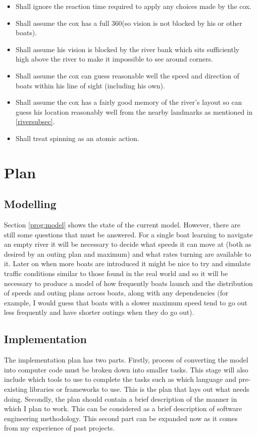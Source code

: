 \begin{itemize}
  \item Shall ignore the reaction time required to apply any choices
    made by the cox.
  \item Shall assume the cox has a full 360\textdegree (so vision is
    not blocked by his or other boats). 
  \item Shall assume his
    vision is blocked by the river bank which sits sufficiently high
    above the river to make it impossible to see around corners.
  \item Shall assume the cox can guess reasonable well the speed and
    direction of boats within his line of sight (including his own).
  \item Shall assume the cox has a fairly good memory of the river's
    layout so can guess his location reasonably well from the nearby
    landmarks as mentioned in \ref{riversubsec}.
  \item Shall treat spinning as an atomic action.
\end{itemize}

\section{Plan}

\subsection{Modelling}

Section \ref{prog:model} shows the state of the current
model. However, there are still some questions that must be
answered. For a single boat learning to navigate an empty river it will be necessary to decide what speeds it can
move at (both as desired by an outing plan and maximum) and what rates
turning are available to it. Later on when more boats are introduced
it might be nice to try and simulate traffic conditions similar to
those found in the real world and
so it will be necessary to produce a model of how frequently boats
launch and the distribution of speeds and outing plans across boats,
along with any dependencies (for example, I would guess that boats
with a slower maximum speed tend to go out less frequently and have
shorter outings when they do go out).

\subsection{Implementation}
The implementation plan has two parts. Firstly, process of converting
the model into computer code must be broken down into smaller
tasks. This stage will also include which tools to use to complete the
tasks such as which language and pre-existing libraries or frameworks
to use. This is the plan that lays out what needs doing. Secondly, the
plan should contain a brief description of the manner in which I plan
to work. This can be considered as a brief description of software
engineering methodology. This second part can be expanded now as it
comes from my experience of past projects.

